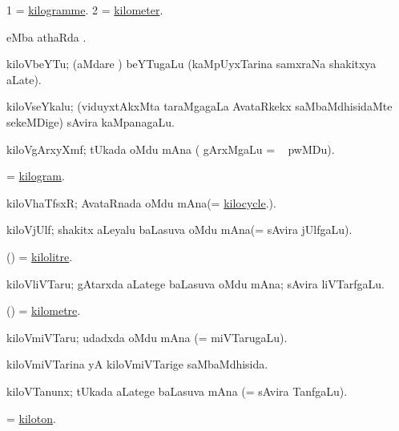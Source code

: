 \bentry
{}
\gl{\nA}
\bmng
\bnum
\num{1}  = \hyperlink{kilogramme}{kilogramme}. 
\num{2}  = \hyperlink{kilometer}{kilometer}. 
\enum
\emng
\eentry

\bentry
{}
\gl{\sapUpa}
\bmng
{} eMba athaRda \sapUpa. \udA\  
\emng
\eentry

\bentry
{}
\gl{\nA}
\bmng
kiloVbeYTu;  (aMdare ) beYTugaLu (kaMpUyxTarina samxraNa shakitxya aLate). 
\emng
\eentry

\bentry
{}
\gl{\nA}
\bmng
kiloVseYkalu; (viduyxtAkxMta taraMgagaLa AvataRkekx saMbaMdhisidaMte sekeMDige) sAvira kaMpanagaLu. 
\emng
\eentry

\bentry
{}
\gl{\nA}
\bmng
kiloVgArxyXmf; tUkada oMdu mAna ( gArxMgaLu = \su\  pwMDu). 
\emng
\eentry

\bentry
{}
\gl{\nA}
\bmng
 = \hyperlink{kilogram}{kilogram}. 
\emng
\eentry

\bentry
{}
\gl{\nA}
\bmng
kiloVhaTfsxR; AvataRnada oMdu mAna(= \hyperlink{kilocycle}{kilocycle}.). 
\emng
\eentry

\bentry
{}
\gl{\nA}
\bmng
kiloVjUlf; shakitx aLeyalu baLasuva oMdu mAna(= sAvira jUlfgaLu). 
\emng
\eentry

\bentry
{}
\gl{\nA}
\bmng
(\ame)  = \hyperlink{kilolitre}{kilolitre}. 
\emng
\eentry

\bentry
{}
\gl{\nA}
\bmng
kiloVliVTaru; gAtarxda aLatege baLasuva oMdu mAna; sAvira liVTarfgaLu. 
\emng
\eentry

\bentry
{}
\gl{\nA}
\bmng
(\ame) =  \hyperlink{kilometre}{kilometre}.
\emng
\eentry

\bentry
{}
\gl{\nA}
\bmng
kiloVmiVTaru; udadxda oMdu mAna (=  miVTarugaLu). 
\emng
\eentry

\bentry
{}
\gl{\gu}
\bmng
kiloVmiVTarina yA kiloVmiVTarige saMbaMdhisida. 
\emng
\eentry

\bentry
{}
\gl{\nA}
\bmng
kiloVTanunx; tUkada aLatege baLasuva mAna (= sAvira TanfgaLu). 
\emng
\eentry

\bentry
{}
\gl{\nA}
\bmng
 = \hyperlink{kiloton}{kiloton}. 
\emng
\eentry

